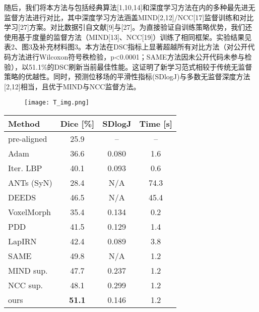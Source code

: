随后，我们将本方法与包括经典算法[1,10,14]和深度学习方法在内的多种最先进无监督方法进行对比，其中深度学习方法涵盖MIND[2,12]/NCC[17]监督训练和对比学习[27]方案。对比数据引自文献[9]与[27]。为直接验证自训练策略优势，我们还使用基于度量的监督方法（MIND[13]、NCC[19]）训练了相同框架。实验结果见表2、图3及补充材料图3。本方法在DSC指标上显著超越所有对比方法（对公开代码方法进行Wilcoxon符号秩检验，p<0.0001；SAME方法因未公开代码未参与检验），以51.1\%的DSC刷新当前最佳性能。这证明了新学习范式相较于传统无监督策略的优越性。同时，预测位移场的平滑性指标(SDlogJ)与多数无监督深度方法[2,12]相当，且优于MIND与NCC监督方法。

\begin{figure}
  \centering
  \texttt{[image: T\_img.png]}
\end{figure}

\begin{table}
  \vspace{0.5em}\centering\wuhao
  \begin{tabular}{lccc}
    \toprule
    \textbf{Method} & \textbf{Dice [\%]} & \textbf{SDlogJ} & \textbf{Time [s]} \\
    \midrule
    pre-aligned     & 25.9               & --              & --                \\
    Adam            & 36.6               & 0.080           & 1.6               \\
    Iter. LBP       & 40.1               & 0.093           & 0.6               \\
    ANTs (SyN)      & 28.4               & {N/A}           & 74.3              \\
    DEEDS           & 46.5               & {N/A}           & 45.4              \\
    \midrule
    VoxelMorph      & 35.4               & 0.134           & 0.2               \\
    PDD             & 41.5               & 0.129           & 1.4               \\
    LapIRN          & 42.4               & 0.089           & 3.8               \\
    SAME            & 49.8               & {N/A}           & 1.2               \\
    \midrule
    MIND sup.       & 47.7               & 0.237           & 1.2               \\
    NCC sup.        & 48.1               & 0.299           & 1.2               \\
    \midrule
    ours            & \textbf{51.1}      & 0.146           & 1.2               \\
    \bottomrule
  \end{tabular}
\end{table}

